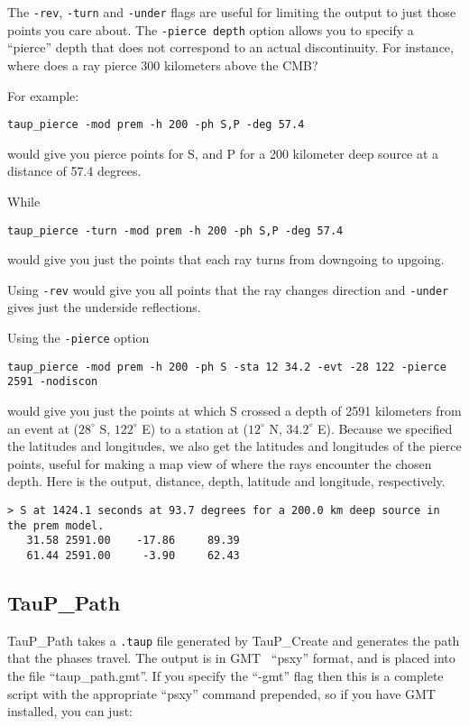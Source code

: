 The \texttt{-rev}, \texttt{-turn} and \texttt{-under} flags are useful 
for limiting the output
to just those points you care about. The \texttt{-pierce depth} option 
allows you
to specify a ``pierce'' depth that does not correspond to an
actual discontinuity. For instance, where does a ray pierce 300 kilometers
above the CMB?

For example:

\texttt{taup\_pierce -mod prem -h 200 -ph S,P -deg 57.4}

would give you pierce points for S, and P for a 200 kilometer
deep source at a distance of 57.4 degrees. 

While

\texttt{taup\_pierce -turn -mod prem -h 200 -ph S,P -deg 57.4}

would give you just the points that each ray turns from downgoing to upgoing.

Using \texttt{-rev} would give you all points that the ray changes direction and \texttt{-under} gives just the underside reflections. 

Using the \texttt{-pierce} option

\texttt{taup\_pierce -mod prem -h 200 -ph S -sta 12 34.2 -evt -28 122 -pierce 2591 -nodiscon}

would give you just the points at which S crossed a depth of 2591 kilometers
from an event at ($28^\circ$ S, $122^\circ$ E)
to a station at ($12^\circ$ N, $34.2^\circ$ E). 
Because we specified the latitudes and longitudes, we also get the 
latitudes and longitudes of 
the pierce points, useful for making
a map view of where the rays encounter the chosen depth. Here is the output,
distance, depth, latitude and longitude, respectively.
\begin{verbatim}
> S at 1424.1 seconds at 93.7 degrees for a 200.0 km deep source in the prem model.
   31.58 2591.00    -17.86     89.39
   61.44 2591.00     -3.90     62.43
\end{verbatim}

\subsection{TauP\_Path}
TauP\_Path takes a \texttt{.taup} file generated by TauP\_Create and generates the
path that the phases travel. The output is in GMT~\cite{GMT} ``psxy'' format, and is
placed into the file ``taup\_path.gmt''. 
If you specify the ``-gmt'' flag then this 
is a complete script with the appropriate ``psxy'' command prepended, so if you
have GMT installed, you can just:

